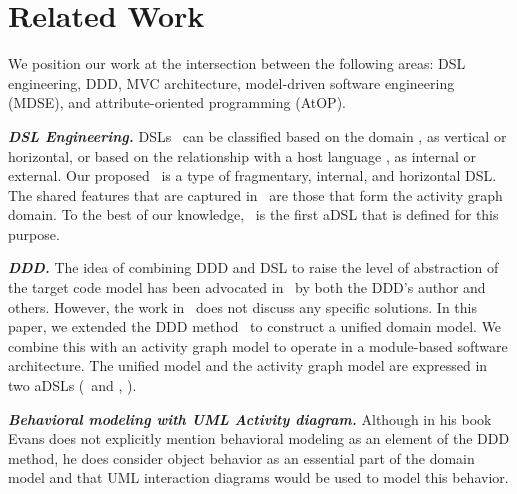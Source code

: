 %
\section{Related Work}\label{sect:relatedwork} %
We position our work at the intersection between the following areas: DSL engineering, DDD, MVC architecture, model-driven software engineering (MDSE), and attribute-oriented programming (AtOP).

\textbf{\textit{DSL Engineering.}}
DSLs~\cite{van_deursen_domain-specific_2000, mernik_when_2005} can be classified based on the domain \cite{kleppe_software_2008}, as vertical or horizontal, or based on the relationship with a host language \cite{fowler_domain-specific_2010, van_deursen_domain-specific_2000, mernik_when_2005}, as internal or external. 
%
Our proposed \agl~is a type of fragmentary, internal, and horizontal DSL. The shared features that are captured in \agl~are those that form the activity graph domain. To the best of our knowledge, \agl~is the first aDSL that is defined for this purpose.

\textbf{\textit{DDD.}}
The idea of combining DDD and DSL to raise the level of 
abstraction of the target code model has been advocated in~\cite{fowler_domain-specific_2010} by both the DDD's author and others. However, the work in~\cite{fowler_domain-specific_2010} does not discuss any specific solutions.
In this paper, we extended the DDD method~\cite{evans_domain-driven_2004} to construct a unified domain model. We combine this with an activity graph model to operate in a module-based software architecture. The unified model and the activity graph model are expressed in two aDSLs (\dcsl~and \agl, \resp).

\textbf{\textit{Behavioral modeling with UML Activity diagram.}}
Although in his book~\cite{evans_domain-driven_2004} Evans does not explicitly mention behavioral modeling as an element of the DDD method, he does consider object behavior as an essential part of the domain model and that UML interaction diagrams would be used to model this behavior. 

